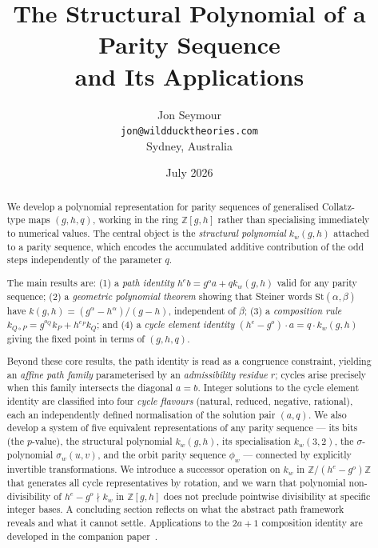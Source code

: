 \documentclass[12pt]{article}
\title{The Structural Polynomial of a Parity Sequence\\
and Its Applications}
\author{Jon Seymour\\
  \texttt{jon@wildducktheories.com}\\
  Sydney, Australia}
\date{July 2026}
\theoremstyle{definition}
\theoremstyle{remark}
\newcommand{\ZZ}{\mathbb{Z}}
\newcommand{\St}{\mathrm{St}}
\newcommand{\kpoly}{k}
\begin{document}
\maketitle

\begin{abstract}
We develop a polynomial representation for parity sequences of generalised
Collatz-type maps $(g,h,q)$, working in the ring $\ZZ[g,h]$ rather than
specialising immediately to numerical values.  The central object is the
\emph{structural polynomial} $\kpoly_w(g,h)$ attached to a parity sequence,
which encodes the accumulated additive contribution of the odd steps
independently of the parameter $q$.

The main results are: (1) a \emph{path identity} $h^e b = g^o a + q\kpoly_w(g,h)$
valid for any parity sequence; (2) a \emph{geometric polynomial theorem} showing
that Steiner words $\St(\alpha,\beta)$ have $\kpoly(g,h) = (g^\alpha -
h^\alpha)/(g-h)$, independent of $\beta$; (3) a \emph{composition rule}
$\kpoly_{Q\circ P} = g^{o_Q}\kpoly_P + h^{e_P}\kpoly_Q$; and (4) a
\emph{cycle element identity} $(h^e - g^o)\cdot a = q\cdot\kpoly_w(g,h)$
giving the fixed point in terms of $(g,h,q)$.

Beyond these core results, the path identity is read as a congruence
constraint, yielding an \emph{affine path family} parameterised by an
\emph{admissibility residue} $r$; cycles arise precisely when this family
intersects the diagonal $a = b$.  Integer solutions to the cycle element
identity are classified into four \emph{cycle flavours} (natural, reduced,
negative, rational), each an independently defined normalisation of the
solution pair $(a,q)$.  We also develop a system of five equivalent
representations of any parity sequence --- its bits (the $p$-value), the
structural polynomial $\kpoly_w(g,h)$, its specialisation $\kpoly_w(3,2)$,
the $\sigma$-polynomial $\sigma_w(u,v)$, and the orbit parity sequence $\phi_w$ ---
connected by explicitly invertible transformations.  We introduce a
successor operation on $\kpoly_w$ in $\ZZ/(h^e-g^o)\ZZ$ that generates all
cycle representatives by rotation, and we warn that polynomial
non-divisibility of $h^e - g^o \nmid \kpoly_w$ in $\ZZ[g,h]$ does not
preclude pointwise divisibility at specific integer bases.  A concluding
section reflects on what the abstract path framework reveals and what it
cannot settle.
Applications to the $2a+1$ composition identity are developed in the companion
paper~\cite{paper73}.
\end{abstract}
\end{document}
